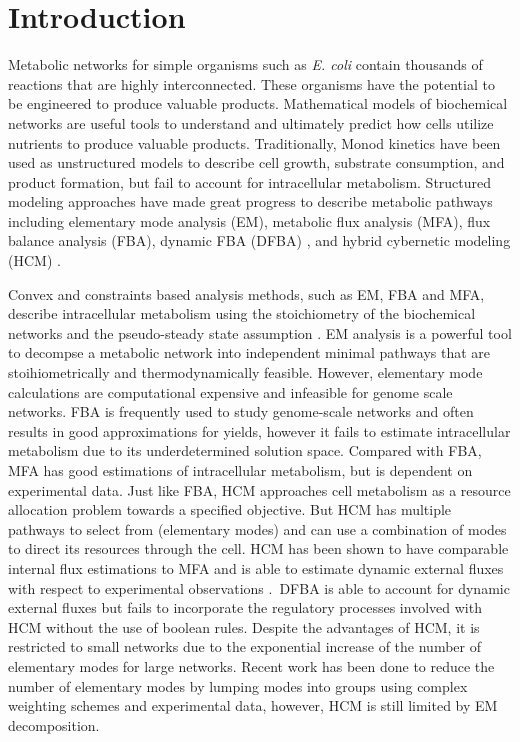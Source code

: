 \documentclass[10pt,twocolumn,twoside,final]{IEEEtran}
\begin{document}
\section{Introduction}
Metabolic networks for simple organisms such as \textit{E. coli} contain thousands of reactions that are highly interconnected.
These organisms have the potential to be engineered to produce valuable products.
Mathematical models of biochemical networks are useful tools to understand and ultimately predict how cells utilize nutrients to produce valuable products.
Traditionally, Monod kinetics have been used as unstructured models to describe cell growth, substrate consumption, and product formation, but fail to account for intracellular metabolism\cite{shuler_book}.
Structured modeling approaches have made great progress to describe metabolic pathways including elementary mode analysis (EM)\cite{2006_vonKamp_Metatool}, metabolic flux analysis (MFA), flux balance analysis (FBA)\cite{2010_orth_NatBiotech}, dynamic FBA (DFBA) \cite{1994_varma_palsson_ApplEnvMicro,2002_Mahadevan_BiophysJ}, and hybrid cybernetic modeling (HCM) \cite{2008_kim_varner_ramkrishna_BiotechProg}.

Convex and constraints based analysis methods, such as EM, FBA and MFA,
describe intracellular metabolism using the stoichiometry of the biochemical networks and the pseudo-steady state assumption \cite{2010_orth_NatBiotech}.
EM analysis is a powerful tool to decompse a metabolic network into independent minimal pathways that are stoihiometrically and thermodynamically feasible.
However, elementary mode calculations are computational expensive and infeasible for genome scale networks\cite{2004_lee_varner_ko_ieee}.
FBA is frequently used to study genome-scale networks\cite{2010_orth_NatBiotech} and often results in good approximations for yields, however it fails to estimate intracellular metabolism due to its underdetermined solution space.
Compared with FBA, MFA has good estimations of intracellular metabolism, but is dependent on experimental data.
Just like FBA, HCM approaches cell metabolism as a resource allocation problem towards a specified objective.
But HCM has multiple pathways to select from (elementary modes) and can use a combination of modes to direct its resources through the cell.
HCM has been shown to have comparable internal flux estimations to MFA and is able to estimate dynamic external fluxes with respect to experimental observations \cite{2008_kim_varner_ramkrishna_BiotechProg}.\
DFBA is able to account for dynamic external fluxes but fails to incorporate the regulatory processes involved with HCM without the use of boolean rules\cite{2001_covert_schilling_palsson}.
Despite the advantages of HCM, it is restricted to small networks due to the exponential increase of the number of elementary modes for large networks.
Recent work has been done to reduce the number of elementary modes by lumping modes into groups using complex weighting schemes and experimental data\cite{2010_song_ramkrishna}, however, HCM is still limited by EM decomposition.
\end{document}
